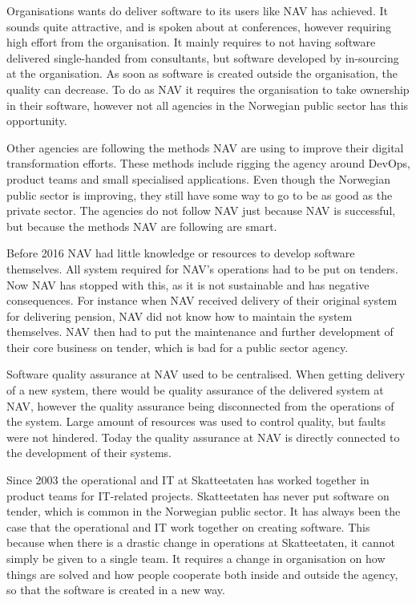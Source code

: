 Organisations wants do deliver software to its users like NAV has achieved. It sounds quite attractive, and is spoken about at conferences, however requiring high effort from the organisation. It mainly requires to not having software delivered single-handed from consultants, but software developed by in-sourcing at the organisation. As soon as software is created outside the organisation, the quality can decrease. To do as NAV it requires the organisation to take ownership in their software, however not all agencies in the Norwegian public sector has this opportunity.

Other agencies are following the methods NAV are using to improve their digital transformation efforts. These methods include rigging the agency around DevOps, product teams and small specialised applications. Even though the Norwegian public sector is improving, they still have some way to go to be as good as the private sector. The agencies do not follow NAV just because NAV is successful, but because the methods NAV are following are smart.

Before 2016 NAV had little knowledge or resources to develop software themselves. All system required for NAV's operations had to be put on tenders. Now NAV has stopped with this, as it is not sustainable and has negative consequences. For instance when NAV received delivery of their original system for delivering pension, NAV did not know how to maintain the system themselves. NAV then had to put the maintenance and further development of their core business on tender, which is bad for a public sector agency.

Software quality assurance at NAV used to be centralised. When getting delivery of a new system, there would be quality assurance of the delivered system at NAV, however the quality assurance being disconnected from the operations of the system. Large amount of resources was used to control quality, but faults were not hindered. Today the quality assurance at NAV is directly connected to the development of their systems.

Since 2003 the operational and IT at Skatteetaten has worked together in product teams for IT-related projects. Skatteetaten has never put software on tender, which is common in the Norwegian public sector. It has always been the case that the operational and IT work together on creating software. This because when there is a drastic change in operations at Skatteetaten, it cannot simply be given to a single team. It requires a change in organisation on how things are solved and how people cooperate both inside and outside the agency, so that the software is created in a new way.

